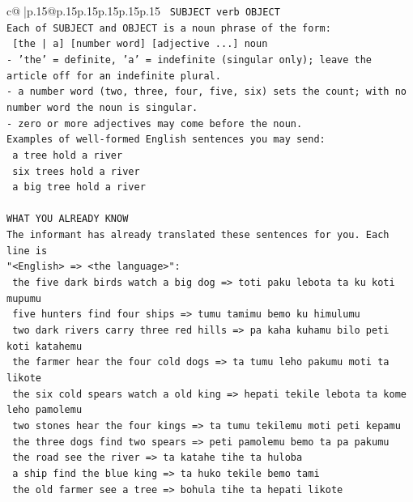 \documentclass{article}
\begin{document}
{\begin{supertabular}{c@{$\;$}|p{.15\linewidth}@{}p{.15\linewidth}p{.15\linewidth}p{.15\linewidth}p{.15\linewidth}p{.15\linewidth}}
{{{\texttt{    SUBJECT  verb  OBJECT} \\
\texttt{Each of SUBJECT and OBJECT is a noun phrase of the form:} \\
\texttt{    {[}the | a{]}  {[}number word{]}  {[}adjective ...{]}  noun} \\
\texttt{{-} 'the' = definite, 'a' = indefinite (singular only); leave the article off for an indefinite plural.} \\
\texttt{{-} a number word (two, three, four, five, six) sets the count; with no number word the noun is singular.} \\
\texttt{{-} zero or more adjectives may come before the noun.} \\
\texttt{Examples of well{-}formed English sentences you may send:} \\
\texttt{    a tree hold a river} \\
\texttt{    six trees hold a river} \\
\texttt{    a big tree hold a river} \\
\\ 
\texttt{WHAT YOU ALREADY KNOW} \\
\texttt{The informant has already translated these sentences for you. Each line is} \\
\texttt{"<English>  =>  <the language>":} \\
\texttt{    the five dark birds watch a big dog  =>  toti paku lebota ta ku koti mupumu} \\
\texttt{    five hunters find four ships  =>  tumu tamimu bemo ku himulumu} \\
\texttt{    two dark rivers carry three red hills  =>  pa kaha kuhamu bilo peti koti katahemu} \\
\texttt{    the farmer hear the four cold dogs  =>  ta tumu leho pakumu moti ta likote} \\
\texttt{    the six cold spears watch a old king  =>  hepati tekile lebota ta kome leho pamolemu} \\
\texttt{    two stones hear the four kings  =>  ta tumu tekilemu moti peti kepamu} \\
\texttt{    the three dogs find two spears  =>  peti pamolemu bemo ta pa pakumu} \\
\texttt{    the road see the river  =>  ta katahe tihe ta huloba} \\
\texttt{    a ship find the blue king  =>  ta huko tekile bemo tami} \\
\texttt{    the old farmer see a tree  =>  bohula tihe ta hepati likote} \\
}}}
\end{supertabular}}
\end{document}
